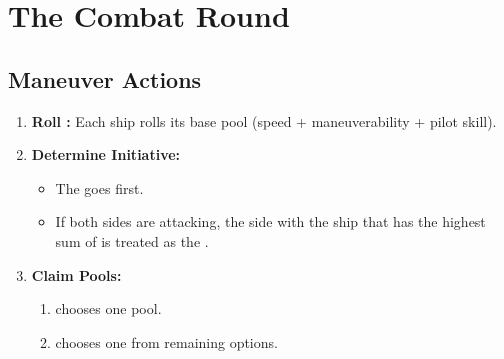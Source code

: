 \section{The Combat Round}

\subsection{Maneuver Actions}

\begin{enumerate}
    \item \textbf{Roll \dicetype{\maneuver}:} Each ship rolls its base \dicetype{\maneuver} pool (speed + maneuverability + pilot skill).
    
    \item \textbf{Determine Initiative:} 
    \begin{itemize}
        \item The \attackingside{} goes first.
        \item If both sides are attacking, the side with the ship that has the highest sum of \dicetype{\maneuver} is treated as the \attackingside.
    \end{itemize}

    \item \textbf{Claim \dicetype{\environmental} Pools:}
    \begin{enumerate}
        \item \attackingside{} chooses one \dicetype{\environmental} pool.
        \item {} chooses one from remaining options.
    \end{enumerate}


\end{enumerate}
